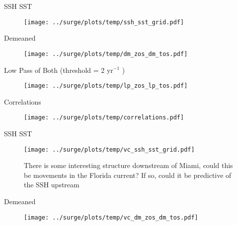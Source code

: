 
\begin{frame}{SSH SST}
\vspace{-20pt}
\begin{figure}
\texttt{[image: ../surge/plots/temp/ssh\_sst\_grid.pdf]}
\caption{}
\end{figure}
\end{frame}


\begin{frame}{Demeaned}
\vspace{-20pt}
\begin{figure}
\texttt{[image: ../surge/plots/temp/dm\_zos\_dm\_tos.pdf]}
\caption{}
\end{figure}
\end{frame}


\begin{frame}{Low Pass of Both (threshold = 2 yr$^{-1}$ )}
\vspace{-20pt}
\begin{figure}
\texttt{[image: ../surge/plots/temp/lp\_zos\_lp\_tos.pdf]}
\caption{}
\end{figure}
\end{frame}


\begin{frame}{Correlations}
\vspace{-20pt}
\begin{figure}
\texttt{[image: ../surge/plots/temp/correlations.pdf]}
\caption{}
\end{figure}
\end{frame}


\begin{frame}{SSH SST}
\vspace{-20pt}
\begin{figure}
\texttt{[image: ../surge/plots/temp/vc\_ssh\_sst\_grid.pdf]}
\caption{There is some interesting structure downstream of Miami, could this be
         movements in the Florida current?
         If so, could it be predictive of the SSH upstream}
\end{figure}
\end{frame}


\begin{frame}{Demeaned}
\vspace{-20pt}
\begin{figure}
\texttt{[image: ../surge/plots/temp/vc\_dm\_zos\_dm\_tos.pdf]}
\caption{ }
\end{figure}
\end{frame}


